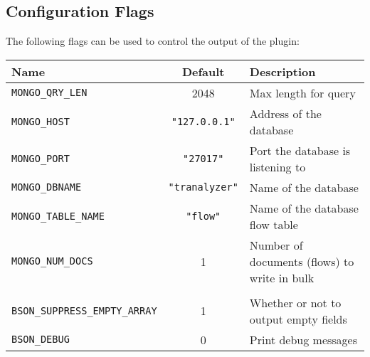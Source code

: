 \documentclass[documentation]{subfiles}
\begin{document}
\subsection{Configuration Flags}
The following flags can be used to control the output of the plugin:
\begin{longtable}{lcl}
    \toprule
    {\bf Name} & {\bf Default} & {\bf Description}\\
    \midrule\endhead%
    {\tt MONGO\_QRY\_LEN}    & 2048               & Max length for query\\
    {\tt MONGO\_HOST}        & {\tt "127.0.0.1"}  & Address of the database\\
    {\tt MONGO\_PORT}        & {\tt "27017"}      & Port the database is listening to\\
    {\tt MONGO\_DBNAME}      & {\tt "tranalyzer"} & Name of the database\\
    {\tt MONGO\_TABLE\_NAME} & {\tt "flow"}       & Name of the database flow table\\
    {\tt MONGO\_NUM\_DOCS}   & 1                  & Number of documents (flows) to write in bulk\\\\

    {\tt BSON\_SUPPRESS\_EMPTY\_ARRAY} & 1 & Whether or not to output empty fields\\
    {\tt BSON\_DEBUG}                  & 0 & Print debug messages\\
    \bottomrule
\end{longtable}
\end{document}
